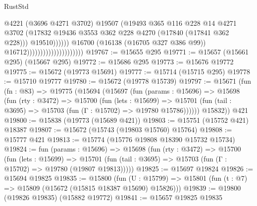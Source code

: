 \begin{lexlean}{RustStd}
\begin{coremodule}
                                                        @4221
                                                        (@3696 @4271 @3702)
                                                        @19507
                                                        (@19493
                                                          @365
                                                          @116
                                                          @228
                                                          @14
                                                          @4271
                                                          @3702
                                                          (@17832
                                                            @19436
                                                            @3553
                                                            @362
                                                            @228
                                                            @4270
                                                            (@17840 (@17841 @362 @228)))
                                                          @19510))))))
                                              @16700
                                              (@16138 (@16705 @327 @386 @99))
                                              @16712)))))))))))))))))))))
@19767 := @15655 @295
@19771 := @15657 (@15661 @295) (@15667 @295)
@19772 := @15686 @295
@19773 := @15676 @19772
@19775 := @15672 (@19773 @15691)
@19777 := @15714 (@15715 @295)
@19778 := @15710 @19777
@19780 := @15672 (@19778 @15739)
@19797 := @15671
    (fun (fn : @83) =>
    @19775
      (@15694
        (@15697
          (fun (params : @15696) =>
          @15698
            (fun (rty : @3472) =>
            @15700
              (fun (lets : @15699) =>
              @15701 (fun (tail : @3695) => @15703 (fun (Γ : @15702) => @19780 @15786))))))
        @15832))
    @421
@19800 := @15838 (@19773 (@15689 @421))
@19803 := @15751 (@15752 @421) @18387
@19807 := @15672 (@15743 (@19803 @15760) @15764)
@19808 := @15777 @421
@19813 := @15774 (@15776 @19808 @18390 @15732 @15734)
@19824 := fun (params : @15696) =>
  @15698
    (fun (rty : @3472) =>
    @15700
      (fun (lets : @15699) =>
      @15701 (fun (tail : @3695) => @15703 (fun (Γ : @15702) => @19780 (@19807 @19813)))))
@19825 := @15697 @19824
@19826 := @15694 @19825
@19835 := @15800
    (fun (U : @15799) => @15801 (fun (t : @7) => @15809 (@15672 (@15815 @18387 @15690) @15826)))
@19839 := @19800 (@19826 @19835) (@15882 @19772)
@19841 := @15657 @19825 @19835

\end{coremodule}
\end{lexlean}
